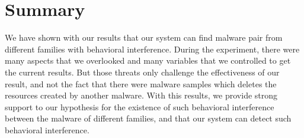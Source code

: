 \section{Summary}
\label{sec:Summary}

We have shown with our results that our system can find malware pair from different families with behavioral interference.
During the experiment, there were  many aspects that we overlooked and many variables that we controlled to get the current results.
But those threats only challenge the effectiveness of our result, and not the fact that there were malware samples which deletes the resources created by another malware.
With this results, we provide strong support to our hypothesis for the existence of such behavioral interference between the malware of different families, and that our system can detect such behavioral interference.

